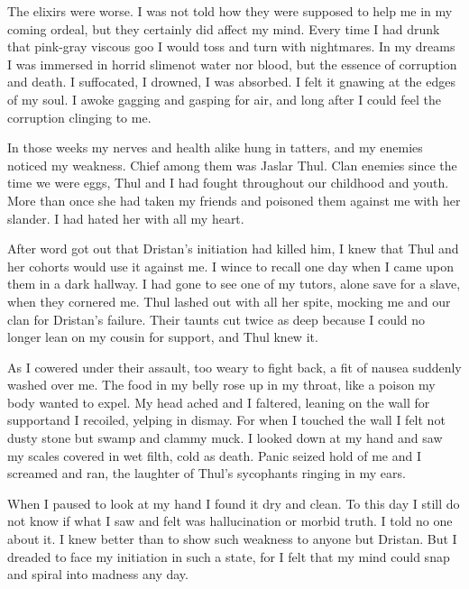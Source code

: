 \documentclass
  [a4paper,
   12pt,
   oneside
  ]%
  {article}
\begin{document}
The elixirs were worse. 
I was not told how they were supposed to help me in my coming ordeal, but they certainly did affect my mind. 
Every time I had drunk that pink-gray viscous goo I would toss and turn with nightmares. 
In my dreams I was immersed in horrid slime\dash not water nor blood, but the essence of corruption and death. 
I suffocated, I drowned, I was absorbed. 
I felt it gnawing at the edges of my soul.
I awoke gagging and gasping for air, and long after I could feel the corruption clinging to me. 

In those weeks my nerves and health alike hung in tatters, and my enemies noticed my weakness.
Chief among them was Jaslar Thul. 
Clan enemies since the time we were eggs, Thul and I had fought throughout our childhood and youth. 
More than once she had taken my friends and poisoned them against me with her slander. 
I had hated her with all my heart. 

After word got out that Dristan's initiation had killed him, I knew that Thul and her cohorts would use it against me. 
I wince to recall one day when I came upon them in a dark hallway. 
I had gone to see one of my tutors, alone save for a \human slave, when they cornered me.\index{\human} 
Thul lashed out with all her spite, mocking me and our clan for Dristan's failure. 
Their taunts cut twice as deep because I could no longer lean on my cousin for support, and Thul knew it. 

As I cowered under their assault, too weary to fight back, a fit of nausea suddenly washed over me. 
The food in my belly rose up in my throat, like a poison my body wanted to expel. 
My head ached and I faltered, leaning on the wall for support\dash and I recoiled, yelping in dismay. 
For when I touched the wall I felt not dusty stone but swamp and clammy muck. 
I looked down at my hand and saw my scales covered in wet filth, cold as death. 
Panic seized hold of me and I screamed and ran, the laughter of Thul's sycophants ringing in my ears. 

When I paused to look at my hand I found it dry and clean.
To this day I still do not know if what I saw and felt was hallucination or morbid truth. 
I told no one about it. 
I knew better than to show such weakness to anyone but Dristan. 
But I dreaded to face my initiation in such a state, for I felt that my mind could snap and spiral into madness any day. 
\end{document}
